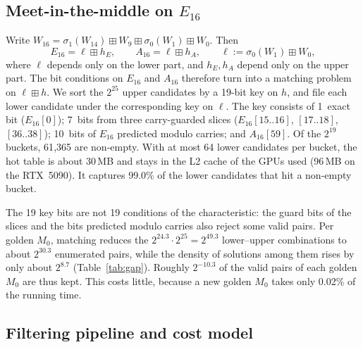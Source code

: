\documentclass[11pt]{article}
\begin{document}
\subsection{Meet-in-the-middle on $E_{16}$}

Write $W_{16}=\sigma_1(W_{14})\boxplus W_9\boxplus\sigma_0(W_1)\boxplus W_0$. Then
\[
E_{16} = \ell \boxplus h_E, \qquad A_{16} = \ell \boxplus h_A, \qquad \ell := \sigma_0(W_1)\boxplus W_0,
\]
where $\ell$ depends only on the lower part, and $h_E,h_A$ depend only on the upper part. The bit conditions on $E_{16}$ and $A_{16}$ therefore turn into a matching problem on $\ell\boxplus h$. We sort the $2^{25}$ upper candidates by a 19-bit key on $h$, and file each lower candidate under the corresponding key on $\ell$. The key consists of 1~exact bit ($E_{16}[0]$); 7~bits from three carry-guarded slices ($E_{16}[15..16]$, $[17..18]$, $[36..38]$); 10~bits of $E_{16}$ predicted modulo carries; and $A_{16}[59]$. Of the $2^{19}$ buckets, 61{,}365 are non-empty. With at most 64 lower candidates per bucket, the hot table is about 30\,MB and stays in the L2 cache of the GPUs used (96\,MB on the RTX~5090). It captures 99.0\% of the lower candidates that hit a non-empty bucket.

The 19 key bits are not 19 conditions of the characteristic: the guard bits of the slices and the bits predicted modulo carries also reject some valid pairs. Per golden $M_0$, matching reduces the $2^{24.3}\cdot 2^{25}=2^{49.3}$ lower--upper combinations to about $2^{30.3}$ enumerated pairs, while the density of solutions among them rises by only about $2^{8.7}$ (Table~\ref{tab:gap}). Roughly $2^{-10.3}$ of the valid pairs of each golden $M_0$ are thus kept. This costs little, because a new golden $M_0$ takes only 0.02\% of the running time.

\subsection{Filtering pipeline and cost model}
\end{document}
